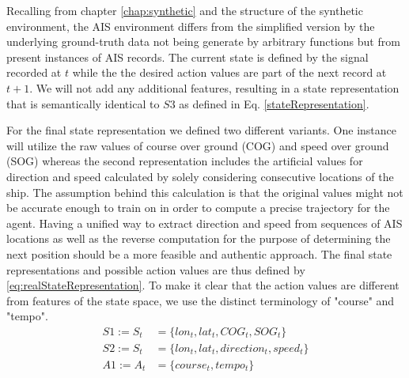 Recalling from chapter \ref{chap:synthetic} and the structure of the synthetic environment, the AIS environment differs from the simplified version by the underlying ground-truth data not being generate by arbitrary functions but from present instances of AIS records. The current state is defined by the signal recorded at $t$ while the the desired action values are part of the next record at $t+1$. We will not add any additional features, resulting in a state representation that is semantically identical to $S3$ as defined in Eq. \ref{stateRepresentation}.
\par
For the final state representation we defined two different variants. One instance will utilize the raw values of course over ground (COG) and speed over ground (SOG) whereas the second representation includes the artificial values for direction and speed calculated by solely considering consecutive locations of the ship. The assumption behind this calculation is that the original values might not be accurate enough to train on in order to compute a precise trajectory for the agent. Having a unified way to extract direction and speed from sequences of AIS locations as well as the reverse computation for the purpose of determining the next position should be a more feasible and authentic approach. The final state representations and possible action values are thus defined by \ref{eq:realStateRepresentation}. To make it clear that the action values are different from features of the state space, we use the distinct terminology of "course" and "tempo".
\begin{equation}
\begin{aligned}
    S1 := S_t &= \{lon_t, lat_t, COG_t, SOG_t\}
\\
    S2 := S_t &= \{lon_t,lat_t, direction_t, speed_t\}
\\
    A1 := A_t &= \{course_t, tempo_t\}
    \end{aligned}
\end{equation} \label{eq:realStateRepresentation}

